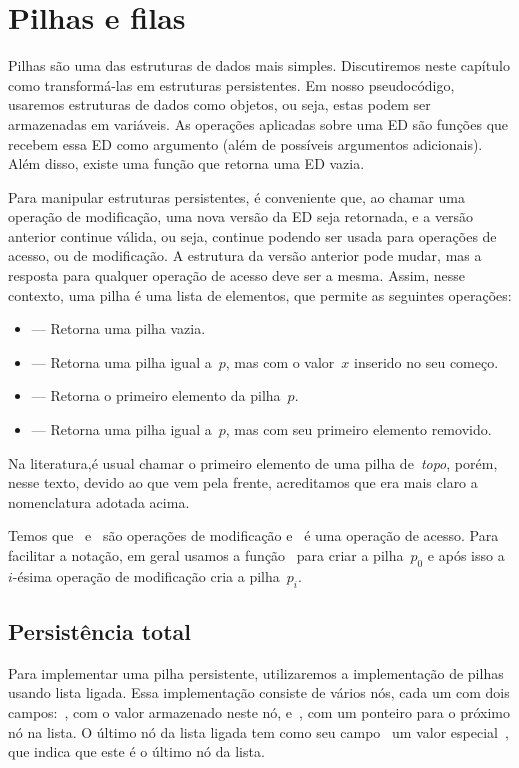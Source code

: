 \documentclass[main.tex]{subfiles}
\begin{document}
\chapter{Pilhas e filas} \label{cap:pilha_persist}
Pilhas são uma das estruturas de dados mais simples. Discutiremos neste capítulo como transformá-las em estruturas persistentes. Em nosso pseudocódigo, usaremos estruturas de dados como objetos, ou seja, estas podem ser armazenadas em variáveis. As operações aplicadas sobre uma ED são funções que recebem essa ED como argumento (além de possíveis argumentos adicionais). Além disso, existe uma função que retorna uma ED vazia.

Para manipular estruturas persistentes, é conveniente que, ao chamar uma operação de modificação, uma nova versão da ED seja retornada, e a versão anterior continue válida, ou seja, continue podendo ser usada para operações de acesso, ou de modificação. A estrutura da versão anterior pode mudar, mas a resposta para qualquer operação de acesso deve ser a mesma. Assim, nesse contexto, uma pilha é uma lista de elementos, que permite as seguintes operações:

\begin{itemize}
	\item {} --- Retorna uma pilha vazia.
	\item {} --- Retorna uma pilha igual a~$p$, mas com o valor~$x$ inserido no seu começo.
	\item {} --- Retorna o primeiro elemento da pilha~$p$.
	\item {} --- Retorna uma pilha igual a~$p$, mas com seu primeiro elemento removido.
\end{itemize}

Na literatura,é usual chamar o primeiro elemento de uma pilha de~\emph{topo}, porém, nesse texto, devido ao que vem pela frente, acreditamos que era mais claro a nomenclatura adotada acima.

Temos que~ e~ são operações de modificação e~ é uma operação de acesso. Para facilitar a notação, em geral usamos a função~ para criar a pilha~$p_0$ e após isso a~$i$-ésima operação de modificação cria a pilha~$p_i$.

\section{Persistência total}

Para implementar uma pilha persistente, utilizaremos a implementação de pilhas usando lista ligada. Essa implementação consiste de vários nós, cada um com dois campos:~, com o valor armazenado neste nó, e~, com um ponteiro para o próximo nó na lista. O último nó da lista ligada tem como seu campo~ um valor especial~, que indica que este é o último nó da lista.
\end{document}
